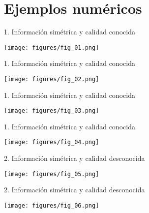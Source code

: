 \section[Ejemplo]{Ejemplos numéricos}

\begin{frame}{1. Información simétrica y calidad conocida}
	\begin{center}
		\texttt{[image: figures/fig\_01.png]}
	\end{center}
\end{frame}
\begin{frame}{1. Información simétrica y calidad conocida}
	\begin{center}
		\texttt{[image: figures/fig\_02.png]}
	\end{center}
\end{frame}
\begin{frame}{1. Información simétrica y calidad conocida}
	\begin{center}
		\texttt{[image: figures/fig\_03.png]}
	\end{center}
\end{frame}
\begin{frame}{1. Información simétrica y calidad conocida}
	\begin{center}
		\texttt{[image: figures/fig\_04.png]}
	\end{center}
\end{frame}
\begin{frame}{2. Información simétrica y calidad desconocida}
	\begin{center}
		\texttt{[image: figures/fig\_05.png]}
	\end{center}
\end{frame}
\begin{frame}{2. Información simétrica y calidad desconocida}
	\begin{center}
		\texttt{[image: figures/fig\_06.png]}
	\end{center}
\end{frame}
